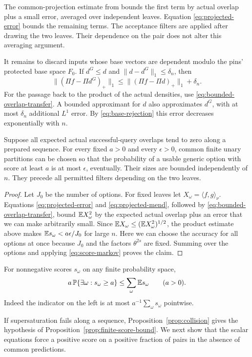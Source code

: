 The common-projection estimate from  bounds the
first term by actual overlap plus a small error, averaged over independent
leaves. Equation \eqref{eq:projected-error} bounds the remaining terms.
The acceptance filters are applied after drawing the two leaves.
Their dependence on the pair does not alter this averaging argument.

It remains to discard inputs whose base vectors are dependent modulo
the pins' protected base space \(F_0\). If \(d^G\le d\)
and \(\|d-d^G\|_1\le\delta_n\), then
\[
 \|(\Pi f-\Pi d^G)_+\|_1
 \le\|(\Pi f-\Pi d)_+\|_1+\delta_n.
\]
For the passage back to the product of the actual densities, use
\eqref{eq:bounded-overlap-transfer}. A bounded approximant for \(d\)
also approximates \(d^G\), with at most \(\delta_n\) additional
\(L^1\) error. By \eqref{eq:base-rejection} this error decreases
exponentially with \(n\).

\begin{proposition}\label{prop:finite-score-bound}
Suppose all expected actual successful-query overlaps tend to zero along
a prepared sequence. For every fixed \(a>0\) and every \(\epsilon>0\),
common finite unary partitions can be chosen so that the probability of
a usable generic option with score at least \(a\) is at most \(\epsilon\),
eventually. Their sizes are bounded independently of \(n\).
They precede all permitted filters depending on the two leaves.
\end{proposition}
\begin{proof}
Let \(J_0\) be the number of options. For fixed leaves let
\(X_\omega=\langle f,g\rangle_\nu\). Equations \eqref{eq:projected-error}
and \eqref{eq:projected-mend}, followed by
\eqref{eq:bounded-overlap-transfer}, bound \(\mathbb E X_\omega^2\) by the
expected actual overlap plus an error that we can make arbitrarily
small. Since \(\mathbb E X_\omega\le(\mathbb E X_\omega^2)^{1/2}\), the product
estimate above makes \(\mathbb E s_\omega<a\epsilon/J_0\) for large \(n\).
Here we can choose the accuracy for all options at once because \(J_0\)
and the factors \(\theta^{2s}\) are fixed. Summing over the options
and applying \eqref{eq:score-markov} proves the claim.

\end{proof}

For nonnegative scores \(s_\omega\) on any finite probability space,
\begin{equation}\label{eq:score-markov}
 a\,\mathbb P\{\exists\omega:s_\omega\ge a\}
 \le\sum_\omega\mathbb E s_\omega\qquad(a>0).
\end{equation}
Indeed the indicator on the left is at most
\(a^{-1}\sum_\omega s_\omega\) pointwise.

If supersaturation fails along a sequence, Proposition~\ref{prop:collision}
gives the hypothesis of Proposition~\ref{prop:finite-score-bound}.
We next show that the scalar equations force a positive score on a
positive fraction of pairs in the absence of common predictions.
